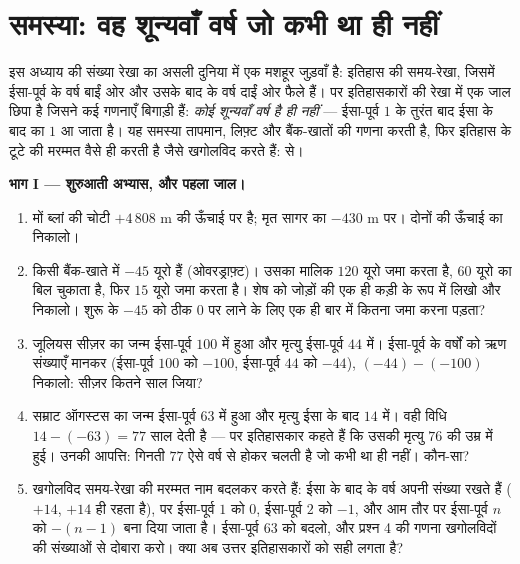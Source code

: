 \section{समस्या: वह शून्यवाँ वर्ष जो कभी था ही नहीं}

\begin{problem}
\label{pb:g7:negatives:1}
इस अध्याय की संख्या रेखा का असली दुनिया में एक मशहूर जुड़वाँ है:
इतिहास की समय-रेखा, जिसमें ईसा-पूर्व के वर्ष बाईं ओर और उसके
बाद के वर्ष दाईं ओर फैले हैं। पर इतिहासकारों की रेखा में एक जाल
छिपा है जिसने कई गणनाएँ बिगाड़ी हैं: \emph{कोई शून्यवाँ वर्ष है
ही नहीं} --- ईसा-पूर्व $1$ के तुरंत बाद ईसा के बाद का $1$ आ जाता
है। यह समस्या तापमान, लिफ़्ट और बैंक-खातों की गणना करती है, फिर
इतिहास के टूटे  की मरम्मत वैसे ही करती है जैसे खगोलविद
करते हैं:  से।

\medskip
\noindent\textbf{भाग I --- शुरुआती अभ्यास, और पहला जाल।}
\begin{enumerate}
  \item मों ब्लां की चोटी $+4\,808$ m की ऊँचाई पर है; मृत सागर
        का  $-430$ m पर। दोनों की ऊँचाई का 
        निकालो।
  \item किसी बैंक-खाते में $-45$ यूरो हैं (ओवरड्राफ़्ट)। उसका
        मालिक $120$ यूरो जमा करता है, $60$ यूरो का बिल चुकाता
        है, फिर $15$ यूरो जमा करता है। शेष को जोड़ों की एक ही
        कड़ी के रूप में लिखो और निकालो। शुरू के $-45$ को ठीक
        $0$ पर लाने के लिए एक ही बार में कितना जमा करना पड़ता?
  \item जूलियस सीज़र का जन्म ईसा-पूर्व $100$ में हुआ और मृत्यु
        ईसा-पूर्व $44$ में। ईसा-पूर्व के वर्षों को ऋण संख्याएँ
        मानकर (ईसा-पूर्व $100$ को $-100$, ईसा-पूर्व $44$ को
        $-44$), $(-44) - (-100)$ निकालो: सीज़र कितने साल जिया?
  \item सम्राट ऑगस्टस का जन्म ईसा-पूर्व $63$ में हुआ और मृत्यु
        ईसा के बाद $14$ में। वही विधि $14 - (-63) = 77$ साल
        देती है --- पर इतिहासकार कहते हैं कि उसकी मृत्यु $76$ की
        उम्र में हुई। उनकी आपत्ति: गिनती $77$ ऐसे वर्ष से होकर
        चलती है जो कभी था ही नहीं। कौन-सा?
  \item खगोलविद समय-रेखा की मरम्मत नाम बदलकर करते हैं: ईसा के
        बाद के वर्ष अपनी संख्या रखते हैं ($+14$, $+14$ ही रहता
        है), पर ईसा-पूर्व $1$ को $0$, ईसा-पूर्व $2$ को $-1$, और
        आम तौर पर ईसा-पूर्व $n$ को $-(n - 1)$ बना दिया जाता है।
        ईसा-पूर्व $63$ को बदलो, और प्रश्न 4 की गणना खगोलविदों की
        संख्याओं से दोबारा करो। क्या अब उत्तर इतिहासकारों को
        सही लगता है?
\end{enumerate}


\end{problem}
